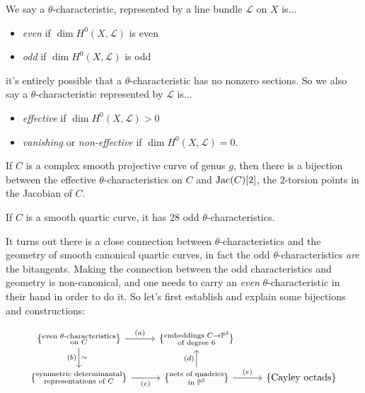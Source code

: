 \documentclass[11pt]{amsart}
\begin{document}
\begin{definition} We say a $\theta$-characteristic, represented by a line bundle $\mathcal{L}$ on $X$ is...
\begin{itemize}
    \item \textit{even} if $\dim H^0(X,\mathcal{L})$ is even
    \item \textit{odd} if $\dim H^0(X,\mathcal{L})$ is odd
\end{itemize}
it's entirely possible that a $\theta$-characteristic has no nonzero sections. So we also say a $\theta$-characteristic represented by $\mathcal{L}$ is...
\begin{itemize}
    \item \textit{effective} if $\dim H^0(X,\mathcal{L})>0$
    \item \textit{vanishing} or \textit{non-effective} if $\dim H^0(X,\mathcal{L}) = 0$.
\end{itemize}
\end{definition}

\begin{remark} If $C$ is a complex smooth projective curve of genus $g$, then there is a bijection between the effective $\theta$-characteristics on $C$ and $\mathrm{Jac}(C)[2]$, the $2$-torsion points in the Jacobian of $C$.
\end{remark}

\begin{example} If $C$ is a smooth quartic curve, it has $28$ odd $\theta$-characteristics.
\end{example}


It turns out there is a close connection between $\theta$-characteristics and the geometry of smooth canonical quartic curves, in fact the odd $\theta$-characteristics \textit{are} the bitangents. Making the connection between the odd characteristics and geometry is non-canonical, and one needs to carry an \textit{even} $\theta$-characteristic in their hand in order to do it. So let's first establish and explain some bijections and constructions:

\[ \begin{tikzcd}
    {\{\substack{\text{even } \theta\text{-characteristics} \\ \text{on }C}\}}\dar["\sim" right,"(b)" left]\rar["(a)"] & {\{\substack{\text{embeddings }C \to \P^3 \\ \text{of degree } 6}\}} & \\
    {\{\substack{\text{symmetric determinantal}\\\text{representations of }C}\}}\rar["(c)" below] & {\{\substack{\text{nets of quadrics}\\\text{in }\P^3}\}}\uar["(d)"]\rar["(e)"] & {\{\text{Cayley octads}\}}
\end{tikzcd} \]
\end{document}
